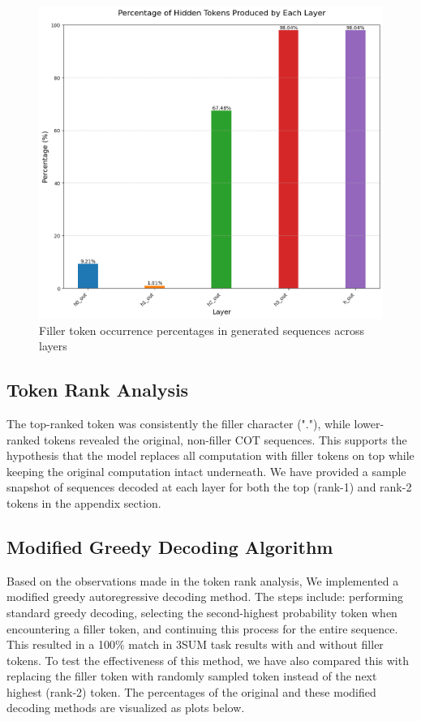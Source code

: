 \documentclass[10pt,a4paper]{article}
\begin{document}
\begin{figure}[H]
\centering
\includegraphics[width=\textwidth]{hidden_tokens_percentage_by_layer.png}
\caption{Filler token occurrence percentages in generated sequences across layers}
\label{fig:hidden_token_percentages}
\end{figure}


\subsection{Token Rank Analysis}
The top-ranked token was consistently the filler character ("."), while lower-ranked tokens revealed the original, non-filler COT sequences. This supports the hypothesis that the model replaces all computation with filler tokens on top while keeping the original computation intact underneath. We have provided a sample snapshot of sequences decoded at each layer for both the top (rank-1) and rank-2 tokens in the appendix section.

\subsection{Modified Greedy Decoding Algorithm}
Based on the observations made in the token rank analysis, We implemented a modified greedy autoregressive decoding method. The steps include: performing standard greedy decoding, selecting the second-highest probability token when encountering a filler token, and continuing this process for the entire sequence. This resulted in a 100\% match in 3SUM task results with and without filler tokens. To test the effectiveness of this method, we have also compared this with replacing the filler token with randomly sampled token instead of the next highest (rank-2) token. The percentages of the original and these modified decoding methods are visualized as plots below. 
\end{document}
